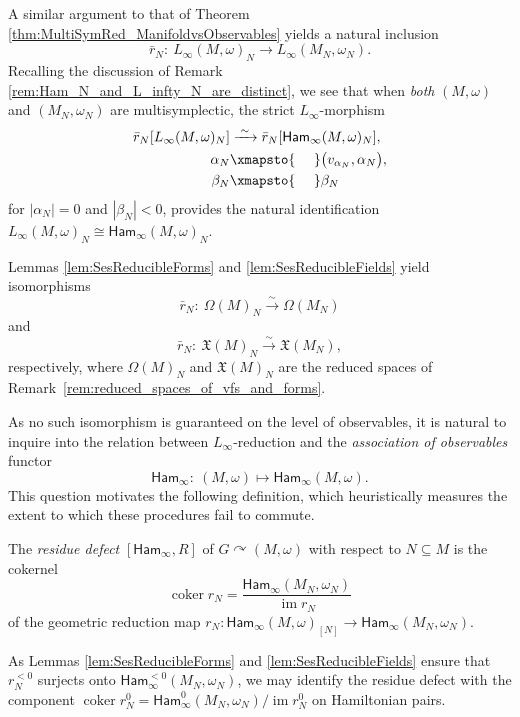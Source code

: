 \documentclass[10pt,a4paper]{amsart}
\numberwithin{equation}{section}
\newcommand{\Ham}{\mathsf{Ham}}
\newcommand{\X}{\mathfrak{X}}
\renewcommand{\subset}{\subseteq}
\begin{document}
\begin{Remark}\label{rem:associated_geometric_reduction_map}
	A similar argument to that of Theorem \ref{thm:MultiSymRed_ManifoldvsObservables} yields a natural inclusion
	\[
		\bar{r}_N \colon \ L_\infty(M,\omega)_N \to L_\infty(M_N,\omega_N).
	\]
	Recalling the discussion of Remark \ref{rem:Ham_N_and_L_infty_N_are_distinct}, we see that when \emph{both} $(M,\omega)$ and $(M_N,\omega_N)$ are multisymplectic, the strict $L_\infty$-morphism
	\begin{align*}
		\bar{r}_N[L_\infty(M,\omega)_N]		&\xrightarrow{\;\sim\;}	\bar{r}_N[\Ham_\infty(M,\omega)_N],	\\
		\alpha_N					&\xmapsto{\;\phantom{\sim}\;}		\bigl(v_{\alpha_N},\alpha_N\bigr),	\\
		\beta_N					&\xmapsto{\;\phantom{\sim}\;}		\beta_N
	\end{align*}
	for $|\alpha_N|=0$ and $|\beta_N|<0$, provides the natural identification $L_\infty(M,\omega)_N\cong\Ham_\infty(M,\omega)_N$.
\end{Remark}

Lemmas \ref{lem:SesReducibleForms} and \ref{lem:SesReducibleFields} yield isomorphisms
\[
	\bar{r}_N\colon \ \Omega(M)_N \xrightarrow{\sim} \Omega(M_N)
\]
and
\[
	\bar{r}_N\colon \ \X(M)_N \xrightarrow{\sim} \X(M_N),
\]
 respectively, where $\Omega(M)_N$ and $\X(M)_N$ are the reduced spaces of Remark~\ref{rem:reduced_spaces_of_vfs_and_forms}.

As no such isomorphism is guaranteed on the level of observables, it is natural to inquire into the relation between $L_\infty$-reduction and the \emph{association of observables} functor
\[
	\Ham_\infty \colon \ (M,\omega) \mapsto \Ham_\infty(M,\omega).
\]
This question motivates the following definition, which heuristically measures the extent to which these procedures fail to commute.

\begin{Definition}\label{def:residue_defect}
	The \emph{residue defect} $[\Ham_\infty,R]$ of $G\curvearrowright(M,\omega)$ with respect to $N\subset M$ is the cokernel
	\[
		\operatorname{coker} r_N = \frac{\Ham_\infty(M_N,\omega_N)}{\operatorname{im} r_N}
	\]
	of the geometric reduction map $r_N\colon \Ham_\infty(M,\omega)_{[N]}\to\Ham_\infty(M_N,\omega_N)$.
\end{Definition}

As Lemmas \ref{lem:SesReducibleForms} and \ref{lem:SesReducibleFields} ensure that $r_N^{<0}$ surjects onto $\Ham_\infty^{<0}(M_N,\omega_N)$, we may identify the residue defect with the component $\operatorname{coker}r_N^0 = \Ham_\infty^0(M_N,\omega_N) / \operatorname{im}r_N^0$ on Hamiltonian pairs.
\end{document}
